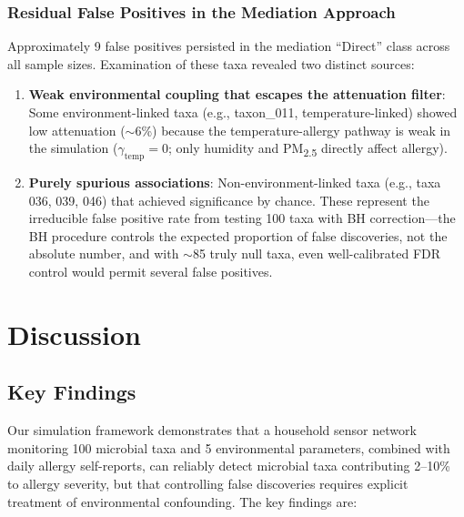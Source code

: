 \documentclass[11pt,letterpaper]{article}
\begin{document}
\subsubsection{Residual False Positives in the Mediation Approach}

Approximately 9 false positives persisted in the mediation ``Direct'' class across all sample sizes. Examination of these taxa revealed two distinct sources:

\begin{enumerate}
    \item \textbf{Weak environmental coupling that escapes the attenuation filter}: Some environment-linked taxa (e.g., taxon\_011, temperature-linked) showed low attenuation ($\sim$6\%) because the temperature-allergy pathway is weak in the simulation ($\gamma_{\text{temp}} = 0$; only humidity and PM\textsubscript{2.5} directly affect allergy).

    \item \textbf{Purely spurious associations}: Non-environment-linked taxa (e.g., taxa 036, 039, 046) that achieved significance by chance. These represent the irreducible false positive rate from testing 100 taxa with BH correction---the BH procedure controls the expected proportion of false discoveries, not the absolute number, and with $\sim$85 truly null taxa, even well-calibrated FDR control would permit several false positives.
\end{enumerate}

\section{Discussion}

\subsection{Key Findings}

Our simulation framework demonstrates that a household sensor network monitoring 100 microbial taxa and 5 environmental parameters, combined with daily allergy self-reports, can reliably detect microbial taxa contributing 2--10\% to allergy severity, but that controlling false discoveries requires explicit treatment of environmental confounding. The key findings are:
\end{document}
